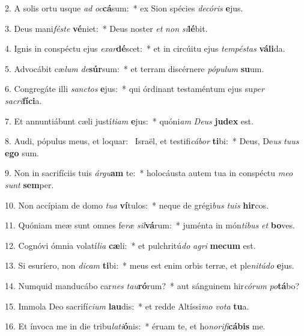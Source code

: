 2. A solis ortu usque \textit{ad} \textit{oc}\textbf{cá}sum:~*  ex Sion spécies \textit{de}\textit{có}\textit{ris} \textbf{e}jus.\

3. Deus mani\textit{fés}\textit{te} \textbf{vé}niet:~*  Deus noster \textit{et} \textit{non} \textit{si}\textbf{lé}bit.\

4. Ignis in conspéctu ejus \textit{ex}\textit{ar}\textbf{dé}scet:~*  et in circúitu ejus \textit{tem}\textit{pés}\textit{tas} \textbf{vá}\textbf{li}da.\

5. Advocábit cæ\textit{lum} \textit{de}\textbf{súr}sum:~*  et terram discérnere \textit{pó}\textit{pu}\textit{lum} \textbf{su}um.\

6. Congregáte illi \textit{sanc}\textit{tos} \textbf{e}jus:~*  qui órdinant testaméntum ejus su\textit{per} \textit{sa}\textit{cri}\textbf{fí}\textbf{ci}a.\

7. Et annuntiábunt cæli justí\textit{ti}\textit{am} \textbf{e}jus:~*  quóni\textit{am} \textit{De}\textit{us} \textbf{ju}\textbf{dex} est.\

8. Audi, pópulus meus, et loquar: \dag\  Israël, et testifi\textit{cá}\textit{bor} \textbf{ti}bi:~*  Deus, De\textit{us} \textit{tu}\textit{us} \textbf{e}\textbf{go} sum.\

9. Non in sacrifíciis tuis \textit{ár}\textit{gu}\textbf{am} te:~*  holocáusta autem tua in conspéctu \textit{me}\textit{o} \textit{sunt} \textbf{sem}per.\

10. Non accípiam de domo \textit{tu}\textit{a} \textbf{ví}tulos:~*  neque de grégi\textit{bus} \textit{tu}\textit{is} \textbf{hir}cos.\

11. Quóniam meæ sunt omnes fe\textit{ræ} \textit{sil}\textbf{vá}rum:~*  juménta in món\textit{ti}\textit{bus} \textit{et} \textbf{bo}ves.\

12. Cognóvi ómnia volatí\textit{li}\textit{a} \textbf{cæ}li:~*  et pulchritú\textit{do} \textit{a}\textit{gri} \textbf{me}\textbf{cum} est.\

13. Si esuríero, non \textit{di}\textit{cam} \textbf{ti}bi:~*  meus est enim orbis terræ, et ple\textit{ni}\textit{tú}\textit{do} \textbf{e}jus.\

14. Numquid manducábo car\textit{nes} \textit{tau}\textbf{ró}rum?~*  aut sánguinem hir\textit{có}\textit{rum} \textit{po}\textbf{tá}bo?\

15. Immola Deo sacrifí\textit{ci}\textit{um} \textbf{lau}dis:~*  et redde Altíssi\textit{mo} \textit{vo}\textit{ta} \textbf{tu}a.\

16. Et ínvoca me in die tribu\textit{la}\textit{ti}\textbf{ó}nis:~*  éruam te, et ho\textit{no}\textit{ri}\textit{fi}\textbf{cá}\textbf{bis} me.\

